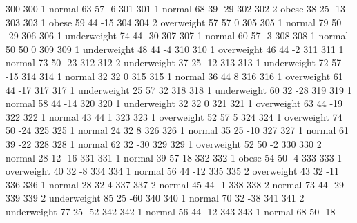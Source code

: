 \begin{Schunk}
\begin{Soutput}
300         300   1      normal  63         57           -6
301         301   1      normal  68         39          -29
302         302   2       obese  38         25          -13
303         303   1       obese  59         44          -15
304         304   2  overweight  57         57            0
305         305   1      normal  79         50          -29
306         306   1 underweight  74         44          -30
307         307   1      normal  60         57           -3
308         308   1      normal  50         50            0
309         309   1 underweight  48         44           -4
310         310   1  overweight  46         44           -2
311         311   1      normal  73         50          -23
312         312   2 underweight  37         25          -12
313         313   1 underweight  72         57          -15
314         314   1      normal  32         32            0
315         315   1      normal  36         44            8
316         316   1  overweight  61         44          -17
317         317   1 underweight  25         57           32
318         318   1 underweight  60         32          -28
319         319   1      normal  58         44          -14
320         320   1 underweight  32         32            0
321         321   1  overweight  63         44          -19
322         322   1      normal  43         44            1
323         323   1  overweight  52         57            5
324         324   1  overweight  74         50          -24
325         325   1      normal  24         32            8
326         326   1      normal  35         25          -10
327         327   1      normal  61         39          -22
328         328   1      normal  62         32          -30
329         329   1  overweight  52         50           -2
330         330   2      normal  28         12          -16
331         331   1      normal  39         57           18
332         332   1       obese  54         50           -4
333         333   1  overweight  40         32           -8
334         334   1      normal  56         44          -12
335         335   2  overweight  43         32          -11
336         336   1      normal  28         32            4
337         337   2      normal  45         44           -1
338         338   2      normal  73         44          -29
339         339   2 underweight  85         25          -60
340         340   1      normal  70         32          -38
341         341   2 underweight  77         25          -52
342         342   1      normal  56         44          -12
343         343   1      normal  68         50          -18

\end{Soutput}
\end{Schunk}
